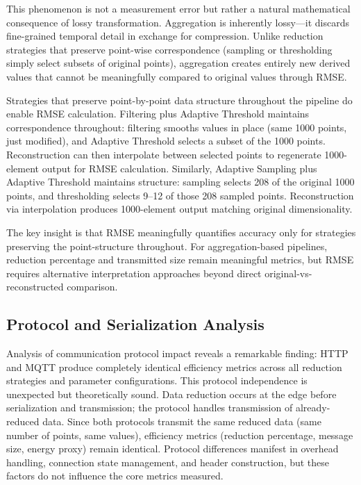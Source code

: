 \documentclass[10pt,twocolumn]{article}
\begin{document}
This phenomenon is not a measurement error but rather a natural mathematical consequence of lossy transformation. Aggregation is inherently lossy---it discards fine-grained temporal detail in exchange for compression. Unlike reduction strategies that preserve point-wise correspondence (sampling or thresholding simply select subsets of original points), aggregation creates entirely new derived values that cannot be meaningfully compared to original values through RMSE.

Strategies that preserve point-by-point data structure throughout the pipeline do enable RMSE calculation. Filtering plus Adaptive Threshold maintains correspondence throughout: filtering smooths values in place (same 1000 points, just modified), and Adaptive Threshold selects a subset of the 1000 points. Reconstruction can then interpolate between selected points to regenerate 1000-element output for RMSE calculation. Similarly, Adaptive Sampling plus Adaptive Threshold maintains structure: sampling selects 208 of the original 1000 points, and thresholding selects 9--12 of those 208 sampled points. Reconstruction via interpolation produces 1000-element output matching original dimensionality.

The key insight is that RMSE meaningfully quantifies accuracy only for strategies preserving the point-structure throughout. For aggregation-based pipelines, reduction percentage and transmitted size remain meaningful metrics, but RMSE requires alternative interpretation approaches beyond direct original-vs-reconstructed comparison.

\vspace{0.15cm}

\subsection{Protocol and Serialization Analysis}

Analysis of communication protocol impact reveals a remarkable finding: HTTP and MQTT produce completely identical efficiency metrics across all reduction strategies and parameter configurations. This protocol independence is unexpected but theoretically sound. Data reduction occurs at the edge before serialization and transmission; the protocol handles transmission of already-reduced data. Since both protocols transmit the same reduced data (same number of points, same values), efficiency metrics (reduction percentage, message size, energy proxy) remain identical. Protocol differences manifest in overhead handling, connection state management, and header construction, but these factors do not influence the core metrics measured.
\end{document}
